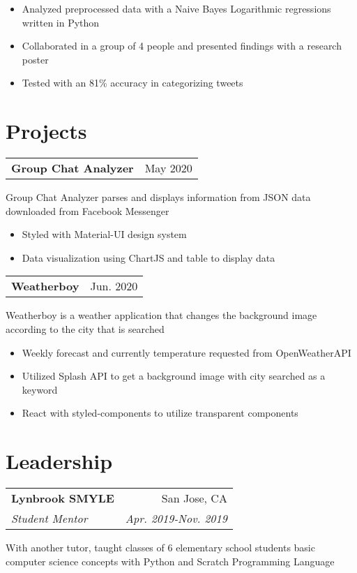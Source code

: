\documentclass[letterpaper,8pt]{article}
\makeatletter
\newcommand{\resumeSubheading}[4]{
  \vspace{0.25em}
  \begin{tabular*}{0.97\textwidth}[t]{l@{\extracolsep{\fill}}r}
    \textbf{#1} & #2 \\
    \textit{#3} & \textit{#4} \\
  \end{tabular*}\vspace{0.25em}
}
\newcommand{\resumeSubheadingTwo}[2]{
  \vspace{0.25em}
  \begin{tabular*}{0.97\textwidth}[t]{l@{\extracolsep{\fill}}r}
    \textbf{#1} & #2 \\
  \end{tabular*}\vspace{0.25em}
}
\makeatother
\begin{document}
\begin{itemize}[label=\raisebox{0.25ex}{\tiny$\bullet$}]
  \item Analyzed preprocessed data with a Naive Bayes Logarithmic regressions written in Python
  \item Collaborated in a group of 4 people and presented findings with a research poster
  \item Tested with an 81\% accuracy in categorizing tweets
\end{itemize}

\section{Projects}

\resumeSubheadingTwo{Group Chat Analyzer}{May 2020}

Group Chat Analyzer parses and displays information from JSON data downloaded from Facebook Messenger

\begin{itemize}[label=\raisebox{0.25ex}{\tiny$\bullet$}]
  \item Styled with Material-UI design system
  \item Data visualization using ChartJS and table to display data
\end{itemize}

\resumeSubheadingTwo{Weatherboy}
{Jun. 2020}

Weatherboy is a weather application that changes the background image according to the city that is searched

\begin{itemize}[label=\raisebox{0.25ex}{\tiny$\bullet$}]
  \item Weekly forecast and currently temperature requested from OpenWeatherAPI
  \item Utilized Splash API to get a background image with city searched as a keyword
  \item React with styled-components to utilize transparent components
\end{itemize}


\section{Leadership}

\resumeSubheading{Lynbrook SMYLE}
{San Jose, CA}{Student Mentor}{Apr. 2019-Nov. 2019}

With another tutor, taught classes of 6 elementary school students basic computer science concepts with Python and Scratch Programming Language
\end{document}
